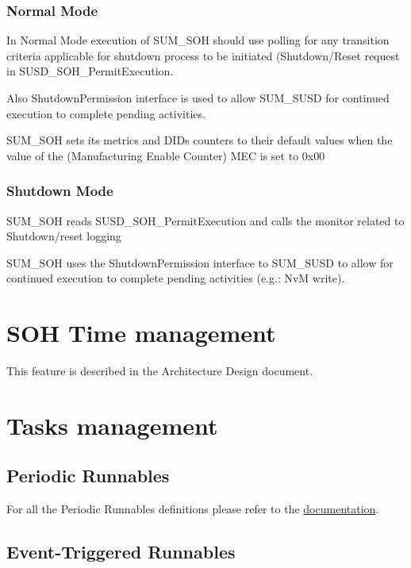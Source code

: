 \subsubsection{Normal Mode}

{In Normal Mode execution of SUM_SOH should use polling for any transition criteria applicable for shutdown
process to be initiated (Shutdown/Reset request in SUSD_SOH_PermitExecution. 

Also ShutdownPermission interface is used to allow SUM_SUSD for continued execution to complete pending activities.
}
{
}

{SUM_SOH sets its metrics and DIDs counters to their default values when the value of the (Manufacturing Enable Counter) MEC is set to 0x00 }
{
  
}

\subsubsection{Shutdown Mode}

{SUM_SOH reads SUSD_SOH_PermitExecution and calls the monitor related to Shutdown/reset logging }
{
}


{SUM_SOH  uses the ShutdownPermission interface to SUM_SUSD to allow for continued execution to complete pending activities (e.g.: NvM write). }
{
}

\section{SOH Time management}
This feature is described in the Architecture Design document.

\section{Tasks management}

\subsection{Periodic Runnables}
For all the Periodic Runnables definitions please refer to the \href{doxygen/html/group___time_periodic.html}{documentation}.

\subsection{Event-Triggered Runnables}
